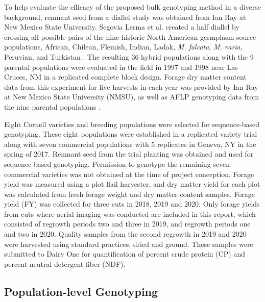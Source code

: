 \documentclass[12pt, letterpaper]{article}
\begin{document}
To help evaluate the efficacy of the proposed bulk genotyping method in a diverse background, remnant seed from a diallel study \parencite{segovia2004} was obtained from Ian Ray at New Mexico State University. Segovia Lerma et al. \parencite*{segovia2004} created a half diallel by crossing all possible pairs of the nine historic North American germplasm source populations, African, Chilean, Flemish, Indian, Ladak, \emph{M. falcata}, \emph{M. varia}, Peruvian, and Turkistan \parencite{barnes1977}. The resulting 36 hybrid populations along with the 9 parental populations were evaluated in the field in 1997 and 1998 near Las Cruces, NM in a replicated complete block design. Forage dry matter content data from this experiment for five harvests in each year was provided by Ian Ray at New Mexico State University (NMSU), as well as AFLP genotyping data from the nine parental populations \parencite[1544 AFLP markers;][]{segovia2004}.

Eight Cornell varieties and breeding populations were selected for sequence-based genotyping. These eight populations were established in a replicated variety trial along with seven commercial populations with 5 replicates in Geneva, NY in the spring of 2017. Remnant seed from the trial planting was obtained and used for sequence-based genotyping. Permission to genotype the remaining seven commercial varieties was not obtained at the time of project conception. Forage yield was measured using a plot flail harvester, and dry matter yield for each plot was calculated from fresh forage weight and dry matter content samples. Forage yield (FY) was collected for three cuts in 2018, 2019 and 2020. Only forage yields from cuts where aerial imaging was conducted are included in this report, which consisted of regrowth periods two and three in 2019, and regrowth periods one and two in 2020. Quality samples from the second regrowth in 2019 and 2020 were harvested using standard practices, dried and ground. These samples were submitted to Dairy One for quantification of percent crude protein (CP) and percent neutral detergent fiber (NDF).

% 

\subsection{Population-level Genotyping}
\end{document}
